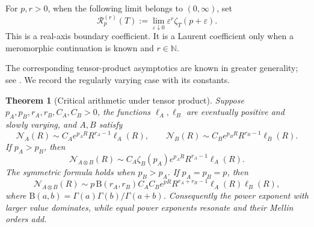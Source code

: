\documentclass[10pt,reqno]{amsart}
\theoremstyle{plain}
\newtheorem{theorem}{Theorem}[section]
\theoremstyle{definition}
\theoremstyle{remark}
\begin{document}
For \(p,r>0\), when the following limit belongs to \((0,\infty)\), set
\begin{equation}
 \mathscr R_p^{(r)}(T)
 :=\lim_{\varepsilon\downarrow0}
 \varepsilon^r\zeta_T(p+\varepsilon).
 \label{cc:eq:Mellin-coefficient}
\end{equation}
This is a real-axis boundary coefficient.  It is a Laurent coefficient
only when a meromorphic continuation is known and \(r\in\mathbb N\).

The corresponding tensor-product asymptotics are known in greater
generality; see \cite{KarolNazarovNikitin08,Rastegaev18}.  We record the
regularly varying case with its constants.

\begin{theorem}[Critical arithmetic under tensor product]
\label{cc:thm:tensor-critical-arithmetic}
Suppose \(p_A,p_B,r_A,r_B,C_A,C_B>0\), the functions
\(\ell_A,\ell_B\) are eventually positive and slowly varying, and
\(A,B\) satisfy
\[
 \mathcal N_A(R)\sim C_Ae^{p_AR}R^{r_A-1}\ell_A(R),
 \qquad
 \mathcal N_B(R)\sim C_Be^{p_BR}R^{r_B-1}\ell_B(R).
\]
If \(p_A>p_B\), then
\begin{equation}
 \mathcal N_{A\otimes B}(R)
 \sim C_A\zeta_B(p_A)e^{p_AR}R^{r_A-1}\ell_A(R).
 \label{cc:eq:nonresonant-product}
\end{equation}
The symmetric formula holds when \(p_B>p_A\).  If
\(p_A=p_B=p\), then
\begin{equation}
 \mathcal N_{A\otimes B}(R)
 \sim p\,\mathrm B(r_A,r_B)C_AC_B
 e^{pR}R^{r_A+r_B-1}\ell_A(R)\ell_B(R),
 \label{cc:eq:resonant-product}
\end{equation}
where
\(\mathrm B(a,b)=\Gamma(a)\Gamma(b)/\Gamma(a+b)\).
Consequently the power exponent with larger value dominates, while equal
power exponents resonate and their Mellin orders add.


\end{theorem}
\end{document}
